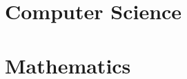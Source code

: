 \documentclass[a4paper, 12pt, oneside]{book}
\title{\heading}
\author{Moritz M. Konarski}
\date{\today}
\begin{document}
\frontmatter
\maketitle
\dominitoc
\tableofcontents
\mainmatter

\chapter{Computer Science}
\minitoc



\nocite{*}



\chapter{Mathematics}
\end{document}
